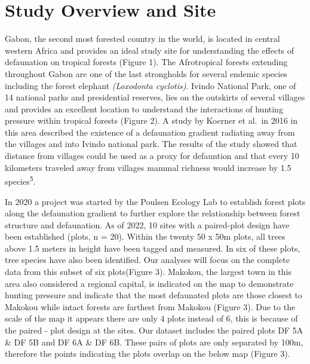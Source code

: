 \documentclass[
  12pt,
]{article}
\begin{document}
\hypertarget{study-overview-and-site}{%
\section{Study Overview and Site}\label{study-overview-and-site}}

Gabon, the second most forested country in the world, is located in
central western Africa and provides an ideal study site for
understanding the effects of defaunation on tropical forests (Figure 1).
The Afrotropical forests extending throughout Gabon are one of the last
strongholds for several endemic species including the forest elephant
\emph{(Loxodonta cyclotis)}. Ivindo National Park, one of 14 national
parks and presidential reserves, lies on the outskirts of several
villages and provides an excellent location to understand the
interactions of hunting pressure within tropical forests (Figure 2). A
study by Koerner et al.~in 2016 in this area described the existence of
a defaunation gradient radiating away from the villages and into Ivindo
national park. The results of the study showed that distance from
villages could be used as a proxy for defauntion and that every 10
kilometers traveled away from villages mammal richness would increase by
1.5 species\textsuperscript{5}.

In 2020 a project was started by the Poulsen Ecology Lab to establish
forest plots along the defaunation gradient to further explore the
relationship between forest structure and defaunation. As of 2022, 10
sites with a paired-plot design have been established (plots, n = 20).
Within the twenty 50 x 50m plots, all trees above 1.5 meters in height
have been tagged and measured. In six of these plots, tree species have
also been identified. Our analyses will focus on the complete data from
this subset of six plots(Figure 3). Makokou, the largest town in this
area also considered a regional capital, is indicated on the map to
demonstrate hunting pressure and indicate that the most defaunated plots
are those closest to Makokou while intact forests are farthest from
Makokou (Figure 3). Due to the scale of the map it appears there are
only 4 plots instead of 6, this is because of the paired - plot design
at the sites. Our dataset includes the paired plots DF 5A \& DF 5B and
DF 6A \& DF 6B. These pairs of plots are only separated by 100m,
therefore the points indicating the plots overlap on the below map
(Figure 3).
\end{document}
